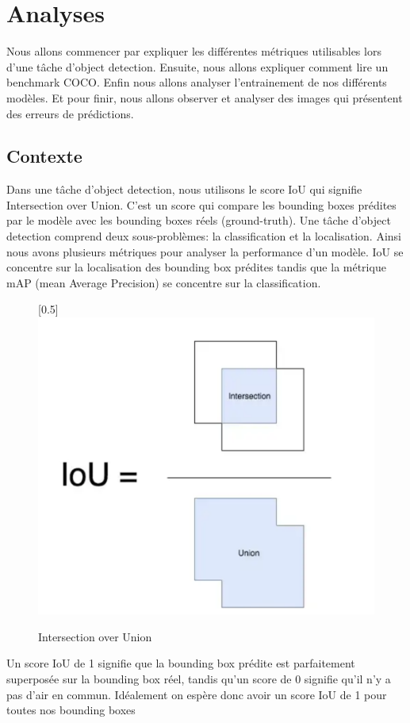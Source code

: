 \chapter{Analyses}
\label{chap:Evaluation}
Nous allons commencer par expliquer les différentes métriques utilisables lors d'une tâche d'object detection. Ensuite, nous allons expliquer comment lire un benchmark COCO. Enfin nous allons analyser l'entrainement de nos différents modèles. Et pour finir, nous allons observer et analyser des images qui présentent des erreurs de prédictions.

\section{Contexte}
Dans une tâche d'object detection, nous utilisons le score IoU qui signifie Intersection over Union.
C'est un score qui compare les bounding boxes prédites par le modèle avec les bounding boxes réels (ground-truth).
Une tâche d'object detection comprend deux sous-problèmes: la classification et la localisation.
Ainsi nous avons plusieurs métriques pour analyser la performance d'un modèle. IoU se concentre sur 
la localisation des bounding box prédites tandis que la métrique mAP (mean Average Precision) 
se concentre sur la classification.
\begin{figure}[bh!]
    \centering
    \scalebox{0.5}[0.5]{\includegraphics[width=\textwidth]{images/iou.png}}
    \caption{Intersection over Union}
    \label{fig:iou}
\end{figure}
Un score IoU de 1 signifie que la bounding box prédite est parfaitement superposée sur la bounding box réel, tandis qu'un score de 0 signifie qu'il n'y a pas d'air en commun. Idéalement on espère donc avoir un score IoU de 1 pour toutes nos bounding boxes


